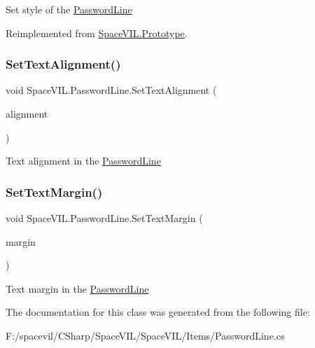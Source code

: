 Set style of the \mbox{\hyperlink{class_space_v_i_l_1_1_password_line}{Password\+Line}} 



Reimplemented from \mbox{\hyperlink{class_space_v_i_l_1_1_prototype_ae96644a6ace490afb376fb542161e541}{Space\+V\+I\+L.\+Prototype}}.

\mbox{\label{class_space_v_i_l_1_1_password_line_a578351e7e63ba70e457e2779fb692c6f}} 
\subsubsection{\texorpdfstring{Set\+Text\+Alignment()}{SetTextAlignment()}}
{\footnotesize\ttfamily void Space\+V\+I\+L.\+Password\+Line.\+Set\+Text\+Alignment (\begin{DoxyParamCaption}\item[{Item\+Alignment}]{alignment }\end{DoxyParamCaption})}



Text alignment in the \mbox{\hyperlink{class_space_v_i_l_1_1_password_line}{Password\+Line}} 

\mbox{\label{class_space_v_i_l_1_1_password_line_affd2b37e2f8bc81d1633b629bae29dfd}} 
\subsubsection{\texorpdfstring{Set\+Text\+Margin()}{SetTextMargin()}}
{\footnotesize\ttfamily void Space\+V\+I\+L.\+Password\+Line.\+Set\+Text\+Margin (\begin{DoxyParamCaption}\item[{\mbox{\hyperlink{struct_space_v_i_l_1_1_decorations_1_1_indents}{Indents}}}]{margin }\end{DoxyParamCaption})}



Text margin in the \mbox{\hyperlink{class_space_v_i_l_1_1_password_line}{Password\+Line}} 



The documentation for this class was generated from the following file\+:\begin{DoxyCompactItemize}
\item 
F\+:/spacevil/\+C\+Sharp/\+Space\+V\+I\+L/\+Space\+V\+I\+L/\+Items/Password\+Line.\+cs\end{DoxyCompactItemize}
